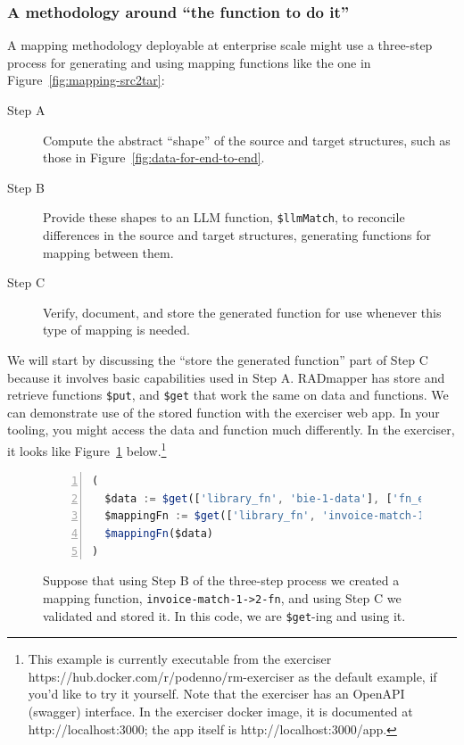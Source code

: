 \documentclass[10pt,letterpaper]{article} %
\newcommand{\stt}[1]{\texttt{#1}} %
\begin{document}
\subsubsection{A methodology around ``the function to do it''}

A mapping methodology deployable at enterprise scale might use a three-step process for generating and using
mapping functions like the one in Figure~\ref{fig:mapping-src2tar}:
\begin{description}
  \item[Step A] Compute the abstract ``shape'' of the source and target structures, such as those in Figure~\ref{fig:data-for-end-to-end}.
  \item[Step B] Provide these shapes to an LLM function, \stt{\$llmMatch}, to reconcile differences in the source and target structures, generating functions for mapping between them.
\item[Step C] Verify, document, and store the generated function for use whenever this type of mapping is needed.
\end{description}

We will start by discussing the ``store the generated function'' part of Step C because it involves basic capabilities used in Step A.
RADmapper has store and retrieve functions \stt{\$put}, and \stt{\$get} that work the same on data and functions.
We can demonstrate use of the stored function with the exerciser web app.
In your tooling, you might access the data and function much differently.
In the exerciser, it looks like Figure~\ref{fig:run-a-map-fn} below.\footnote{This example is currently executable from the exerciser https://hub.docker.com/r/podenno/rm-exerciser as the default example, if you'd like to try it yourself.
  Note that the exerciser has an OpenAPI (swagger) interface.
  In the exerciser docker image, it is documented at http://localhost:3000; the app itself is http://localhost:3000/app.}

\begin{figure}[H]
  \caption{Suppose that using Step B of the three-step process we created a mapping function, \stt{invoice-match-1->2-fn}, and using Step C we validated and stored it.
    In this code, we are \stt{\$get}-ing and using it.}
  \label{fig:run-a-map-fn}
\begin{lstlisting}[language=JavaScript,numberstyle=\scriptsize,basicstyle=\ttfamily\scriptsize,numbers=left,stepnumber=1,breaklines=true]
(
  $data := $get(['library_fn', 'bie-1-data'], ['fn_exe']).fn_exe;
  $mappingFn := $get(['library_fn', 'invoice-match-1->2-fn'], ['fn_exe']).fn_exe;
  $mappingFn($data)
)
\end{lstlisting}
\end{figure} \vspace{-3em}
\end{document}

